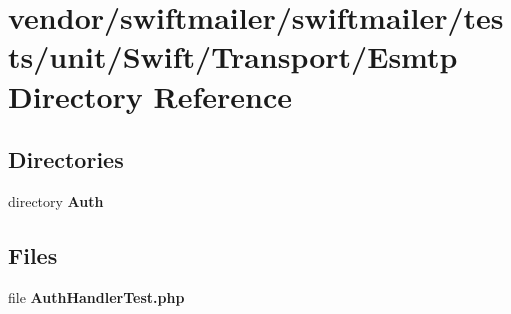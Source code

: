 \section{vendor/swiftmailer/swiftmailer/tests/unit/\+Swift/\+Transport/\+Esmtp Directory Reference}
\label{dir_fd6cd0ce0df7847d96595fc324fbd2d5}
\subsection*{Directories}
\begin{DoxyCompactItemize}
\item 
directory {\bf Auth}
\end{DoxyCompactItemize}
\subsection*{Files}
\begin{DoxyCompactItemize}
\item 
file {\bf Auth\+Handler\+Test.\+php}
\end{DoxyCompactItemize}

